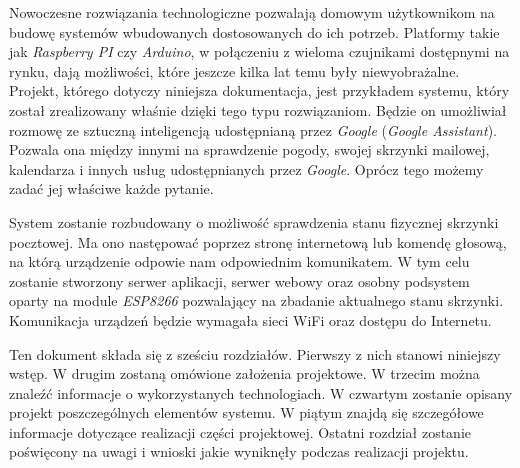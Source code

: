 Nowoczesne rozwiązania technologiczne pozwalają domowym użytkownikom na budowę systemów wbudowanych dostosowanych do ich potrzeb. Platformy takie jak \emph{Raspberry PI} czy \emph{Arduino}, w połączeniu z wieloma czujnikami dostępnymi na rynku, dają możliwości, które jeszcze kilka lat temu były niewyobrażalne. Projekt, którego dotyczy niniejsza dokumentacja, jest przykładem systemu, który został zrealizowany właśnie dzięki tego typu rozwiązaniom. Będzie on umożliwiał rozmowę ze sztuczną inteligencją udostępnianą przez \emph{Google} (\emph{Google Assistant}). Pozwala ona między innymi na sprawdzenie pogody, swojej skrzynki mailowej, kalendarza i innych usług udostępnianych przez \emph{Google}. Oprócz tego możemy zadać jej właściwe każde pytanie.


System zostanie rozbudowany o możliwość sprawdzenia stanu fizycznej skrzynki pocztowej. Ma ono następować poprzez stronę internetową lub komendę głosową, na którą urządzenie odpowie nam odpowiednim komunikatem. W tym celu zostanie stworzony serwer aplikacji, serwer webowy oraz osobny podsystem oparty na module \emph{ESP8266} pozwalający na zbadanie aktualnego stanu skrzynki. Komunikacja urządzeń będzie wymagała sieci WiFi oraz dostępu do Internetu.

Ten dokument składa się z sześciu rozdziałów. Pierwszy z nich stanowi niniejszy wstęp. W drugim zostaną omówione założenia projektowe. W trzecim można znaleźć informacje o wykorzystanych technologiach. W czwartym zostanie opisany projekt poszczególnych elementów systemu. W piątym znajdą się szczegółowe informacje dotyczące realizacji części projektowej. Ostatni rozdział zostanie poświęcony na uwagi i wnioski jakie wyniknęły podczas realizacji projektu.